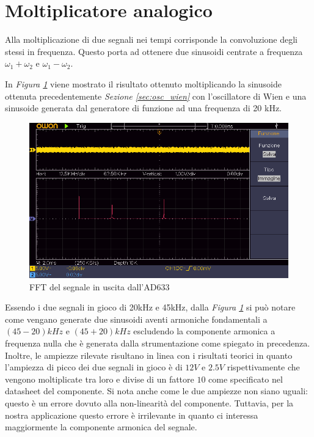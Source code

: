 \documentclass[titlepage]{report}
\begin{document}
		
\newpage
\section{Moltiplicatore analogico}
	Alla moltiplicazione di due segnali nei tempi corrisponde la convoluzione degli stessi in frequenza. Questo porta ad ottenere due sinusoidi centrate a frequenza $\omega_1 + \omega_2$ e $\omega_1 - \omega_2$.
	
	In \textit{Figura \ref{fig:FFTmixer}} viene mostrato il risultato ottenuto moltiplicando la sinusoide ottenuta precedentemente \textit{Sezione \ref{sec:osc_wien}} con l'oscillatore di Wien e una sinusoide generata dal generatore di funzione ad una frequenza di 20 kHz.
	
	\begin{figure}[h]
		\centering
		\includegraphics[scale=0.9]{Immagini/uscita_ad633_con_fcngen_20k_e_osc_45k.png}
		\caption{FFT del segnale in uscita dall'AD633}
		\label{fig:FFTmixer}
	\end{figure}
	
	 Essendo i due segnali in gioco di 20kHz e 45kHz, dalla  \textit{Figura \ref{fig:FFTmixer}}	si può notare come vengano generate due sinusoidi aventi armoniche fondamentali a $(45-20)kHz$ e $(45+20)kHz$ escludendo la componente armonica a frequenza nulla che è generata dalla strumentazione come spiegato in precedenza.
	 \\
	 Inoltre, le ampiezze rilevate risultano in linea con i risultati teorici in quanto l'ampiezza di picco dei due segnali in gioco è di $12V$ e $2.5V$ rispettivamente che vengono moltiplicate tra loro e divise di un fattore $10$ come specificato nel datasheet del componente. Si nota anche come le due ampiezze non siano uguali: questo è un errore dovuto alla non-linearità del componente. Tuttavia, per la nostra applicazione questo errore è irrilevante in quanto ci interessa maggiormente la componente armonica del segnale.
	
\end{document}
